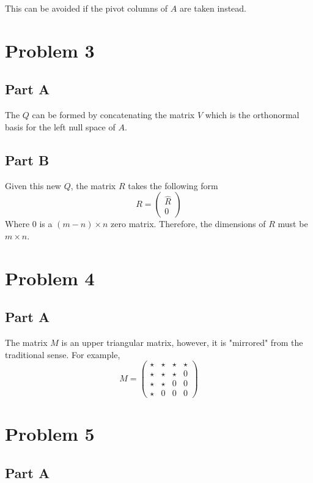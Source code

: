 \documentclass{article}
\begin{document}
This can be avoided if the pivot columns of $A$ are taken instead.

\section*{Problem 3}

\subsection*{Part A}

The $Q$ can be formed by concatenating the matrix $V$ which is the
orthonormal basis for the left null space of $A$.

\subsection*{Part B}

Given this new $Q$, the matrix $R$ takes the following form
$$ R = \begin{pmatrix}
    \hat{R} \\
    0
\end{pmatrix} $$
Where $0$ is a $(m - n) \times n $ zero matrix. Therefore, the dimensions of
$R$ must be $m \times n$.

\section*{Problem 4}

\subsection*{Part A}

The matrix $M$ is an upper triangular matrix, however, it is "mirrored" from
the traditional sense. For example,
$$ M = \begin{pmatrix}
    \star & \star & \star & \star \\
    \star & \star & \star & 0 \\
    \star & \star & 0 & 0 \\
    \star & 0 & 0 & 0
\end{pmatrix} $$

\section*{Problem 5}

\subsection*{Part A}
\end{document}
